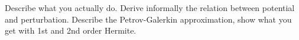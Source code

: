 Describe what you actually do.  Derive informally the relation between potential and perturbation.
Describe the Petrov-Galerkin approximation, show what you get with 1st and 2nd order Hermite.